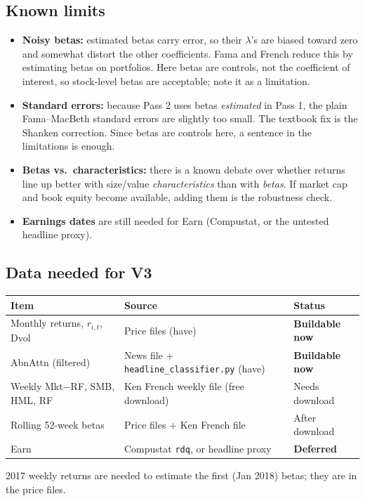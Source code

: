 \documentclass[11pt]{article}
\newcommand{\canbuild}{\textcolor{TealBlue}{\textbf{Buildable now}}}
\newcommand{\dl}{\textcolor{BurntOrange}{\textbf{Deferred}}}
\newcommand{\var}[1]{\texttt{#1}}
\begin{document}
\subsection*{Known limits}
\begin{itemize}
  \item \textbf{Noisy betas:} estimated betas carry error, so their $\lambda$'s are biased toward zero and somewhat distort the other coefficients. Fama and French reduce this by estimating betas on portfolios. Here betas are controls, not the coefficient of interest, so stock-level betas are acceptable; note it as a limitation.
  \item \textbf{Standard errors:} because Pass 2 uses betas \emph{estimated} in Pass 1, the plain Fama--MacBeth standard errors are slightly too small. The textbook fix is the Shanken correction. Since betas are controls here, a sentence in the limitations is enough.
  \item \textbf{Betas vs.\ characteristics:} there is a known debate over whether returns line up better with size/value \emph{characteristics} than with \emph{betas}. If market cap and book equity become available, adding them is the robustness check.
  \item \textbf{Earnings dates} are still needed for Earn (Compustat, or the untested headline proxy).
\end{itemize}

\subsection*{Data needed for V3}
\begin{center}\small
\begin{tabular}{lll}
\toprule
Item & Source & Status\\
\midrule
Monthly returns, $r_{i,t}$, Dvol & Price files (have) & \canbuild\\
AbnAttn (filtered) & News file + \var{headline\_classifier.py} (have) & \canbuild\\
Weekly Mkt$-$RF, SMB, HML, RF & Ken French weekly file (free download) & Needs download\\
Rolling 52-week betas & Price files + Ken French file & After download\\
Earn & Compustat \var{rdq}, or headline proxy & \dl\\
\bottomrule
\end{tabular}
\end{center}
2017 weekly returns are needed to estimate the first (Jan 2018) betas; they are in the price files.
\end{document}
